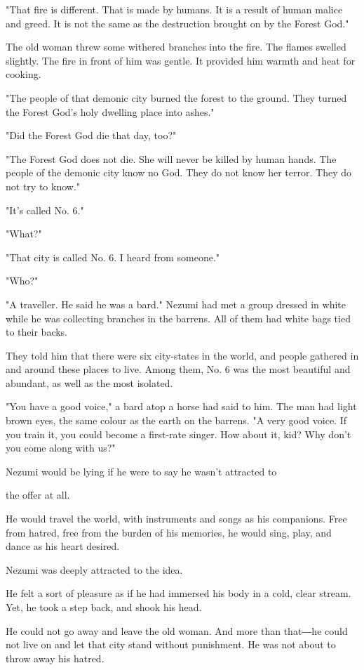 "That fire is different. That is made by humans. It is a result of human
malice and greed. It is not the same as the destruction brought on by
the Forest God."

The old woman threw some withered branches into the fire. The flames
swelled slightly. The fire in front of him was gentle. It provided him
warmth and heat for cooking.

"The people of that demonic city burned the forest to the ground. They
turned the Forest God's holy dwelling place into ashes."

"Did the Forest God die that day, too?"

"The Forest God does not die. She will never be killed by human hands.
The people of the demonic city know no God. They do not know her terror.
They do not try to know."

"It's called No. 6."

"What?"

"That city is called No. 6. I heard from someone."

"Who?"

"A traveller. He said he was a bard." Nezumi had met a group dressed in
white while he was collecting branches in the barrens. All of them had
white bags tied to their backs.

They told him that there were six city-states in the world, and people
gathered in and around these places to live. Among them, No. 6 was the
most beautiful and abundant, as well as the most isolated.

"You have a good voice," a bard atop a horse had said to him. The man
had light brown eyes, the same colour as the earth on the barrens. "A
very good voice. If you train it, you could become a first-rate singer.
How about it, kid? Why don't you come along with us?"

Nezumi would be lying if he were to say he wasn't attracted to~

the offer at all.

He would travel the world, with instruments and songs as his companions.
Free from hatred, free from the burden of his memories, he would sing,
play, and dance as his heart desired.

Nezumi was deeply attracted to the idea.

He felt a sort of pleasure as if he had immersed his body in a cold,
clear stream. Yet, he took a step back, and shook his head.

He could not go away and leave the old woman. And more than that―he
could not live on and let that city stand without punishment. He was not
about to throw away his hatred.

